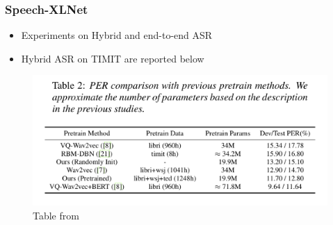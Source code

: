 \documentclass[table]{beamer}
\begin{document}
\begin{frame}
\frametitle{Speech-XLNet}

		\begin{itemize}
			\item Experiments on Hybrid and end-to-end ASR
			\item Hybrid ASR on TIMIT are reported below
		\end{itemize} 


		\begin{figure}
			\centering
			\includegraphics[scale=0.35]	{speechXLNETtable} 
			\caption{Table from  \citep{song2019speechxlnet}}
			\end{figure}

\end{frame}
\end{document}
